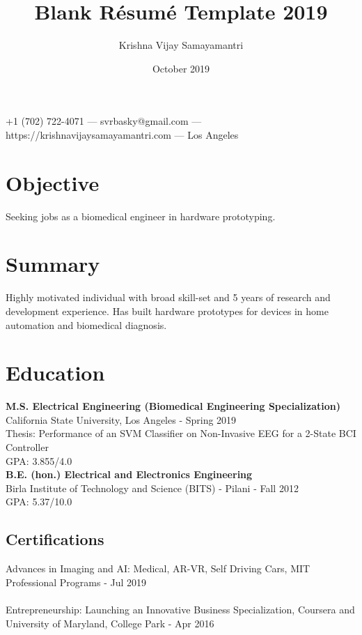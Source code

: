 \documentclass{article}
\makeatletter
\renewcommand{\maketitle}{
\begin{center}
    {\huge\bfseries
    \theauthor}
    
    \vspace{.25em}
    +1 (702) 722-4071 ---
    svrbasky@gmail.com --- https://krishnavijaysamayamantri.com ---
    Los Angeles
    
\end{center}
}
\makeatother
\begin{document}
\title{Blank R\'esum\'e Template 2019}
\author{Krishna Vijay Samayamantri}
\date{October 2019}
\maketitle


\section{Objective}
Seeking jobs as a biomedical engineer in hardware prototyping.

\section{Summary}
Highly motivated individual with broad skill-set and 5 years of research and development experience. Has built hardware prototypes for devices in home automation and biomedical diagnosis.

\section{Education}
\textbf{M.S. Electrical Engineering (Biomedical Engineering Specialization)}\\
\noindent   
California State University, Los Angeles \hfill - Spring 2019\\
\noindent   
Thesis: Performance of an SVM Classifier on Non-Invasive EEG for a 2-State BCI Controller \\
\noindent
GPA: 3.855/4.0 \\


\noindent
\textbf{B.E. (hon.) Electrical and Electronics Engineering}\\
\noindent
Birla Institute of Technology and Science (BITS) - Pilani \hfill - Fall 2012\\
\noindent
GPA: 5.37/10.0

\subsection{Certifications}
Advances in Imaging and AI: Medical, AR-VR, Self Driving Cars, MIT Professional Programs \hfill - Jul 2019\\
\\
\noindent
Entrepreneurship: Launching an Innovative Business Specialization, Coursera and University of Maryland, College Park \hfill - Apr 2016
\end{document}
